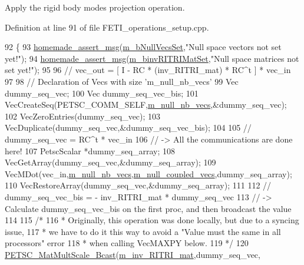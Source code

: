 Apply the rigid body modes projection operation. 



Definition at line 91 of file F\+E\+T\+I\+\_\+operations\+\_\+setup.\+cpp.


\begin{DoxyCode}
92 \{
93     \hyperlink{common__header_8h_a593ccc80b790b2268653fcf6597bf451}{homemade\_assert\_msg}(\hyperlink{classcarl_1_1_f_e_t_i___operations_a96f6ef39dd083e2f659cc0be7e35ff19}{m\_bNullVecsSet},\textcolor{stringliteral}{"Null space vectors not set yet!"});
94     \hyperlink{common__header_8h_a593ccc80b790b2268653fcf6597bf451}{homemade\_assert\_msg}(\hyperlink{classcarl_1_1_f_e_t_i___operations_a259bd691984bbbaa20dcf151adc9bc78}{m\_binvRITRIMatSet},\textcolor{stringliteral}{"Null space matrices not set
       yet!"});
95 
96     \textcolor{comment}{// vec\_out = [ I - RC * (inv\_RITRI\_mat) * RC^t ] * vec\_in}
97 
98     \textcolor{comment}{// Declaration of Vecs with size 'm\_null\_nb\_vecs'}
99     Vec dummy\_seq\_vec;
100     Vec dummy\_seq\_vec\_bis;
101     VecCreateSeq(PETSC\_COMM\_SELF,\hyperlink{classcarl_1_1_f_e_t_i___operations_a6be71b08544858c4b4609bf2a2927a17}{m\_null\_nb\_vecs},&dummy\_seq\_vec);
102     VecZeroEntries(dummy\_seq\_vec);
103     VecDuplicate(dummy\_seq\_vec,&dummy\_seq\_vec\_bis);
104 
105     \textcolor{comment}{// dummy\_seq\_vec = RC^t * vec\_in}
106     \textcolor{comment}{// -> All the communications are done here!}
107     PetscScalar *dummy\_seq\_array;
108     VecGetArray(dummy\_seq\_vec,&dummy\_seq\_array);
109     VecMDot(vec\_in,\hyperlink{classcarl_1_1_f_e_t_i___operations_a6be71b08544858c4b4609bf2a2927a17}{m\_null\_nb\_vecs},\hyperlink{classcarl_1_1_f_e_t_i___operations_a162af22ae7e7410cf5ce6fe07f301e63}{m\_null\_coupled\_vecs},dummy\_seq\_array);
110     VecRestoreArray(dummy\_seq\_vec,&dummy\_seq\_array);
111 
112     \textcolor{comment}{// dummy\_seq\_vec\_bis = - inv\_RITRI\_mat * dummy\_seq\_vec}
113     \textcolor{comment}{// -> Calculate dummy\_seq\_vec\_bis on the first proc, and then broadcast the value}
114     
115     \textcolor{comment}{/*    }
116 \textcolor{comment}{     *    Originally, this operation was done locally, but due to a syncing issue,}
117 \textcolor{comment}{     *    we have to do it this way to avoid a "Value must the same in all processors" error}
118 \textcolor{comment}{     *    when calling VecMAXPY below.}
119 \textcolor{comment}{     */} 
120     \hyperlink{namespacecarl_a561696085e75f9b5013bf61e2ef3de9f}{PETSC\_MatMultScale\_Bcast}(\hyperlink{classcarl_1_1_f_e_t_i___operations_a5b61754f3ea2e4c674fd37f18ec0014b}{m\_inv\_RITRI\_mat},dummy\_seq\_vec,

\end{DoxyCode}
